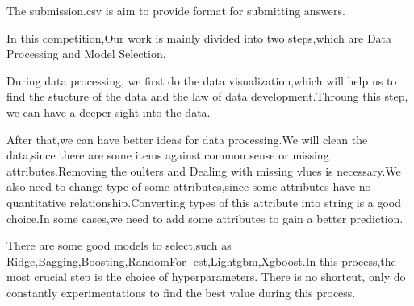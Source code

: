 \newpage
The submission.csv is aim to provide format for submitting answers.
\par
In this competition,Our work is mainly divided into two steps,which are Data Processing and Model Selection.
\par
During data processing, we first do the data visualization,which will help us to find the stucture of the data and the law of data development.Throung this step, we can have a deeper sight into the data.
\par
After that,we can have better ideas for data processing.We will clean the data,since there are some items against common sense or missing attributes.Removing the oulters and Dealing with missing vlues is necessary.We also need to change type of some attributes,since some attributes have no quantitative relationship.Converting types of this attribute into string is a good choice.In some cases,we need to add some attributes to gain a better prediction.
\par
There are some good models to select,such as Ridge,Bagging,Boosting,RandomFor-
est,Lightgbm,Xgboost.In this process,the most crucial step is the choice of hyperparameters. There is no shortcut, only do constantly experimentations to find the best value during this process. 
%
%
%
%
%
%
%
%
%
%
%
%
%
%
%
%
%


